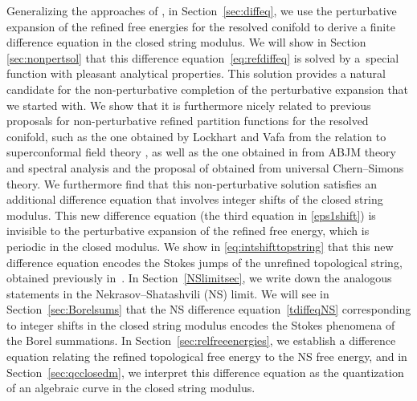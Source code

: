 \documentclass[pdftex]{sigma}
\numberwithin{equation}{section}
\begin{document}
Generalizing the approaches of \cite{alim2020difference, Iwaki2}, in Section~\ref{sec:diffeq}, we use the perturbative expansion of the refined free energies for the resolved conifold to derive a finite difference equation in the closed string modulus. We will show in Section \ref{sec:nonpertsol} that this difference equation~\eqref{eq:refdiffeq} is solved by a~special function with pleasant analytical properties. This solution provides a natural candidate for the non-perturbative completion of the perturbative expansion that we started with. We show that it is furthermore nicely related to previous proposals for non-perturbative refined partition functions for the resolved conifold, such as the one obtained by Lockhart and Vafa from the relation to superconformal field theory \cite{Lockhart:2012vp}, as well as the one obtained in \cite{Hatsuda:2015oaa} from ABJM theory and spectral analysis and the proposal of \cite{Krefl:2015vna} obtained from universal Chern--Simons theory.
We furthermore find that this non-perturbative solution satisfies an additional difference equation that involves integer shifts of the closed string modulus. This new difference equation (the third equation in \eqref{eps1shift}) is invisible to the perturbative expansion of the refined free energy, which is periodic in the closed modulus. We show in \eqref{eq:intshifttopstring} that this new difference equation encodes the Stokes jumps of the unrefined topological string, obtained previously in~\cite{ASTT21}. In Section~\ref{NSlimitsec}, we write down the analogous statements in the Nekrasov--Shatashvili (NS) limit. We will see in Section~\ref{sec:Borelsums} that the NS difference equation~\eqref{tdiffeqNS} corresponding to integer shifts in the closed string modulus encodes the Stokes phenomena of the Borel summations. In Section~\ref{sec:relfreeenergies}, we establish a difference equation relating the refined topological free energy to the NS free energy, and in Section~\ref{sec:qcclosedm}, we interpret this difference equation as the quantization of an algebraic curve in the closed string modulus.
\end{document}
